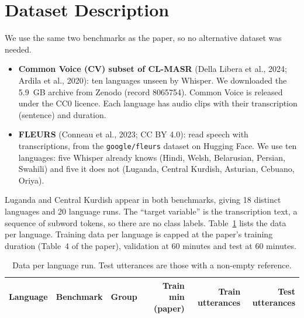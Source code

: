 \documentclass[11pt,a4paper]{article}
\begin{document}
\section{Dataset Description}
We use the same two benchmarks as the paper, so no alternative dataset was needed.
\begin{itemize}
\item \textbf{Common Voice (CV) subset of CL-MASR} (Della Libera et al., 2024; Ardila et al., 2020): ten languages unseen by Whisper. We downloaded the 5.9~GB archive from Zenodo (record 8065754). Common Voice is released under the CC0 licence. Each language has audio clips with their transcription (sentence) and duration.
\item \textbf{FLEURS} (Conneau et al., 2023; CC BY 4.0): read speech with transcriptions, from the \texttt{google/fleurs} dataset on Hugging Face. We use ten languages: five Whisper already knows (Hindi, Welsh, Belarusian, Persian, Swahili) and five it does not (Luganda, Central Kurdish, Asturian, Cebuano, Oriya).
\end{itemize}
Luganda and Central Kurdish appear in both benchmarks, giving 18 distinct languages and 20 language runs. The ``target variable'' is the transcription text, a sequence of subword tokens, so there are no class labels. Table~\ref{tab:data} lists the data per language. Training data per language is capped at the paper's training duration (Table~4 of the paper), validation at 60 minutes and test at 60 minutes.

\begin{table}[H]\centering\footnotesize
\begin{tabular}{llrrr r}\toprule
Language & Benchmark & Group & Train min (paper) & Train utterances & Test utterances\\\midrule

\end{tabular}
\caption{Data per language run. Test utterances are those with a non-empty reference.}\label{tab:data}
\end{table}

\end{document}
